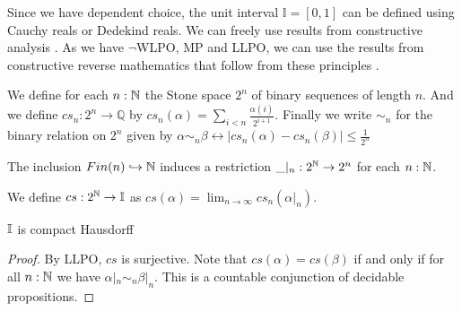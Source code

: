 Since we have dependent choice, the unit interval $\mathbb I = [0,1]$ can be defined using 
Cauchy reals or Dedekind reals. 
We can freely use results from constructive analysis \cite{Bishop}. 
As we have $\neg$WLPO, MP and LLPO, we can use the results from 
constructive reverse mathematics that follow from these principles \cite{ReverseMathsBishop, HannesDiener}. 
\begin{definition}
  \label{def-cs-Interval}
  We define for each $n:\mathbb{N}$ the Stone space $2^n$ of binary sequences of length $n$.
  And we define $cs_n:2^n \to \mathbb Q$ by 
  $cs_n(\alpha) = \sum_{i < n } \frac{\alpha(i)}{2^{i+1}}.$
  Finally we write $\sim_n$ for the binary relation on $2^n$ given by 
  $\alpha\sim_n \beta 
  \leftrightarrow \left|cs_n(\alpha) - cs_n(\beta)\right|\leq\frac{1}{2^n}$
\end{definition}
\begin{remark}
  The inclusion $Fin(n) \hookrightarrow \mathbb{N}$ induces a restriction 
  $\_|_n : 2^{\mathbb{N}} \to 2^n$ for each $n:\mathbb{N}$. 
\end{remark}
\begin{definition}
  We define $cs:2^{\mathbb{N}} \to \mathbb{I}$ as 
  $cs(\alpha) = \lim_{n\to\infty} cs_n(\alpha|_n)$. 
\end{definition}

\begin{theorem}\label{IntervalIsCHaus}
  $\mathbb{I}$ is compact Hausdorff
\end{theorem}
\begin{proof}
  By LLPO, $cs$ is surjective.   
  Note that $cs(\alpha) = cs(\beta)$ if and only if 
  for all $n:\mathbb{N}$ we have $\alpha|_n \sim_n \beta|_n$. 
  This is a countable conjunction of decidable propositions.
\end{proof}

